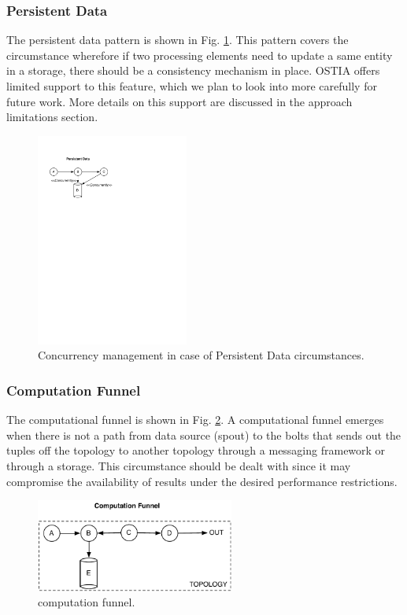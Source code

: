 \subsubsection{Persistent Data}

The persistent data pattern is shown in Fig. \ref{fig:persistence}. This pattern covers the circumstance wherefore if two processing elements need to update a same entity in a storage, there should be a consistency mechanism in place. OSTIA offers limited support to this feature, which we plan to look into more carefully for future work. More details on this support are discussed in the approach limitations section.

\begin{figure}
	\begin{center}
		\includegraphics[width=5cm]{images/persistence}
		\caption{Concurrency management in case of Persistent Data circumstances.}
		\label{fig:persistence}
	\end{center}
\end{figure}


\subsubsection{Computation Funnel}
The computational funnel is shown in Fig. \ref{fig:funnel}. A computational funnel emerges when there is not a path from data source (spout) to the bolts that sends out the tuples off the topology to another topology through a messaging framework or through a storage. This circumstance should be dealt with since it may compromise the availability of results under the desired performance restrictions.

\begin{figure}
	\begin{center}
		\includegraphics[width=6.5cm]{images/funnel}
		\caption{computation funnel.}
		\label{fig:funnel}
	\end{center}
\end{figure}

